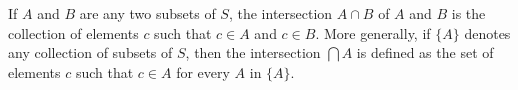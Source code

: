 If $A$ and $B$ are any two subsets of $S$, the intersection $A \cap B$ of $A$ and $B$ is the collection of elements $c$ such that $c \in A$ and $c \in B$. More generally, if $\{A\}$ denotes any collection of subsets of $S$, then the intersection $\bigcap A$ is defined as the set of elements $c$ such that $c \in A$ for every $A$ in $\{A\}$.
